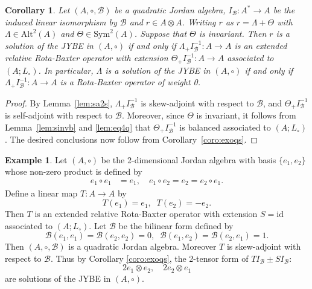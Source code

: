 \documentclass[12pt, reqno, a4paper]{amsart}
\newtheorem{corollary}[theorem]{Corollary}
\theoremstyle{definition}
\newtheorem{example}[theorem]{Example}
\newcommand{\id}{\mathrm{id}}
\begin{document}
\begin{corollary}\label{coro:rexoqs}
	Let $(A, \circ, \mathcal{B})$ be a quadratic Jordan algebra, $I_\mathcal{B}: A^* \to A$ be the induced linear isomorphism by $\mathcal{B}$ and $r \in A \otimes A$.
	Writing $r$ as $r = \Lambda + \Theta$ with $\Lambda \in \mathrm{Alt}^2(A)$ and $\Theta \in \mathrm{Sym}^2(A)$.
	Suppose that $\Theta$ is invariant.
	Then $r$ is a solution of the JYBE in $(A, \circ)$ if and only if $\Lambda_{+}I_\mathcal{B}^{-1}: A \to A$ is an extended relative Rota-Baxter operator with extension $\Theta_{+}I_\mathcal{B}^{-1}: A \to A$ associated to $(A; L_{\circ})$.
	In particular, $\Lambda$ is a solution of the JYBE in $(A, \circ)$ if and only if $\Lambda_{+}I_\mathcal{B}^{-1}: A \to A$ is a Rota-Baxter operator of weight 0.
\end{corollary}
\begin{proof}
	By Lemma~\ref{lem:sa2s}, $\Lambda_{+}I_\mathcal{B}^{-1}$ is skew-adjoint with respect to $\mathcal{B}$, and $\Theta_{+}I_\mathcal{B}^{-1}$ is self-adjoint with respect to $\mathcal{B}$.
	Moreover, since $\Theta$ is invariant, it follows from Lemma~\ref{lem:sinvb} and \ref{lem:eq4q} that $\Theta_{+}I_\mathcal{B}^{-1}$ is balanced associated to $(A; L_{\circ})$.
	The desired conclusions now follow from Corollary~\ref{coro:exoqs}.
\end{proof}

\begin{example}
	Let $(A, \circ)$ be the 2-dimensional Jordan algebra with basis $\{e_1, e_2\}$ whose non-zero product is defined by
	\begin{align*}
		e _1 \circ e_1 & = e_1, \quad e_1 \circ e_2 = e_2 = e_2 \circ e_1.
	\end{align*}
	Define a linear map $T: A \to A$ by
	\begin{equation*}
		T(e_1) =   e_1, \;\; T(e_2) = -   e_2.
	\end{equation*}
	Then $T$ is an extended relative Rota-Baxter operator with extension $S=\id$ associated to $(A; L_{\circ})$.
	Let $\mathcal{B}$ be the bilinear form defined by
	\begin{equation*}
		\mathcal{B}(e_1, e_1) = \mathcal{B}(e_2, e_2) = 0, \;\;
		\mathcal{B}(e_1, e_2) = \mathcal{B}(e_2, e_1) = 1.
	\end{equation*}
	Then $(A, \circ, \mathcal{B})$ is a quadratic Jordan algebra.
	Moreover $T$ is skew-adjoint with respect to $\mathcal{B}$.
	Thus by Corollary \ref{coro:exoqs}, the 2-tensor form of $T I_\mathcal{B} \pm S I_\mathcal{B}$:
	\begin{equation*}
		2 e_1 \otimes e_2, \quad 2e_2 \otimes e_1 
	\end{equation*}
	are solutions of the JYBE in $(A, \circ)$.
\end{example}
\end{document}
